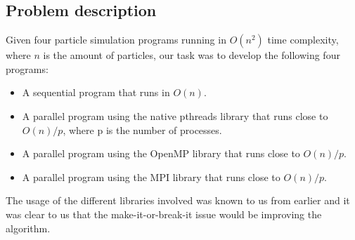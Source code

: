 \documentclass[11pt,a4paper]{article}
\begin{document}
\subsection{Problem description}
Given four particle simulation programs running in $O(n^{2})$ time complexity, where $n$ is the amount of particles, our task was to develop the following four programs:
\begin{itemize}
\item A sequential program that runs in $O(n)$.
\item A parallel program using the native pthreads library that runs close to $O(n)/p$, where p is the number of processes.
\item A parallel program using the OpenMP library that runs close to $O(n)/p$.
\item A parallel program using the MPI library that runs close to $O(n)/p$.
\end{itemize}
The usage of the different libraries involved was known to us from earlier and it was clear to us that the make-it-or-break-it issue would be improving the algorithm.
\newpage
\end{document}
